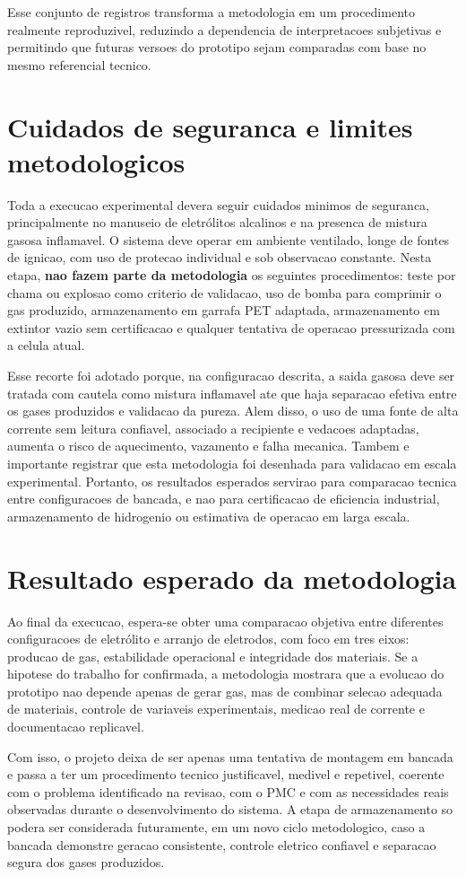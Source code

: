 \documentclass[12pt,oneside,a4paper,brazilian]{abntex2}
\begin{document}
Esse conjunto de registros transforma a metodologia em um procedimento realmente reproduzivel, reduzindo a dependencia de interpretacoes subjetivas e permitindo que futuras versoes do prototipo sejam comparadas com base no mesmo referencial tecnico.

\section{Cuidados de seguranca e limites metodologicos}

Toda a execucao experimental devera seguir cuidados minimos de seguranca, principalmente no manuseio de eletrólitos alcalinos e na presenca de mistura gasosa inflamavel. O sistema deve operar em ambiente ventilado, longe de fontes de ignicao, com uso de protecao individual e sob observacao constante. Nesta etapa, \textbf{nao fazem parte da metodologia} os seguintes procedimentos: teste por chama ou explosao como criterio de validacao, uso de bomba para comprimir o gas produzido, armazenamento em garrafa PET adaptada, armazenamento em extintor vazio sem certificacao e qualquer tentativa de operacao pressurizada com a celula atual.

Esse recorte foi adotado porque, na configuracao descrita, a saida gasosa deve ser tratada com cautela como mistura inflamavel ate que haja separacao efetiva entre os gases produzidos e validacao da pureza. Alem disso, o uso de uma fonte de alta corrente sem leitura confiavel, associado a recipiente e vedacoes adaptadas, aumenta o risco de aquecimento, vazamento e falha mecanica. Tambem e importante registrar que esta metodologia foi desenhada para validacao em escala experimental. Portanto, os resultados esperados servirao para comparacao tecnica entre configuracoes de bancada, e nao para certificacao de eficiencia industrial, armazenamento de hidrogenio ou estimativa de operacao em larga escala.

\section{Resultado esperado da metodologia}

Ao final da execucao, espera-se obter uma comparacao objetiva entre diferentes configuracoes de eletrólito e arranjo de eletrodos, com foco em tres eixos: producao de gas, estabilidade operacional e integridade dos materiais. Se a hipotese do trabalho for confirmada, a metodologia mostrara que a evolucao do prototipo nao depende apenas de gerar gas, mas de combinar selecao adequada de materiais, controle de variaveis experimentais, medicao real de corrente e documentacao replicavel.

Com isso, o projeto deixa de ser apenas uma tentativa de montagem em bancada e passa a ter um procedimento tecnico justificavel, medivel e repetivel, coerente com o problema identificado na revisao, com o PMC e com as necessidades reais observadas durante o desenvolvimento do sistema. A etapa de armazenamento so podera ser considerada futuramente, em um novo ciclo metodologico, caso a bancada demonstre geracao consistente, controle eletrico confiavel e separacao segura dos gases produzidos.
\end{document}
